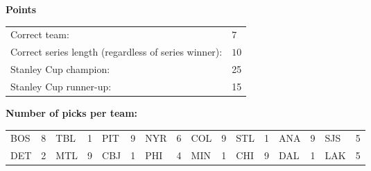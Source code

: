 \documentclass[10pt]{article}
\begin{document}
{\bf Points}\\
\begin{minipage}{12cm}
    \begin{tabular}{l l}
        Correct team:	& $7$\\
        Correct series length (regardless of series winner):	& $10$\\
        Stanley Cup champion:	& 25\\
        Stanley Cup runner-up:	& 15\\
    \end{tabular}

    \vspace{1cm}
    {\bf Number of picks per team:}\\
    \begin{tabular}{lc | lc | lc | lc | lc | lc | lc | lc }
        BOS & 8 & TBL & 1 & PIT & 9 & NYR & 6 & COL & 9 & STL & 1 & ANA & 9 & SJS & 5 \\
        DET & 2 & MTL & 9 & CBJ & 1 & PHI & 4 & MIN & 1 & CHI & 9 & DAL & 1 & LAK & 5 \\
    \end{tabular}
\end{minipage}
\end{document}
